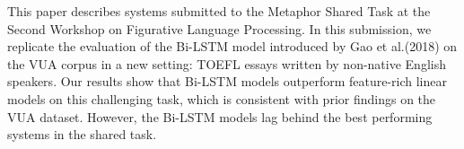 This paper describes systems submitted to the Metaphor Shared Task  at  the  Second  Workshop on Figurative Language Processing. In this submission, we replicate the evaluation of the Bi-LSTM model introduced by Gao et al.(2018) on the VUA  corpus in a new setting: TOEFL essays written by non-native English speakers. Our results show that Bi-LSTM models outperform feature-rich linear models on this challenging task, which is consistent with prior findings on the VUA dataset. However, the Bi-LSTM models lag behind the best performing systems in the shared task.
